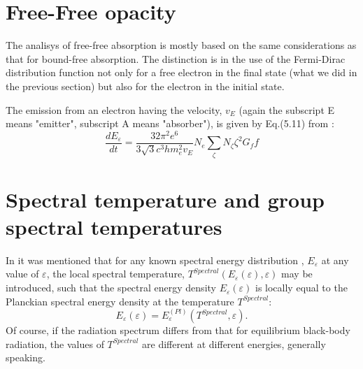 \section{Free-Free opacity}
The analisys of free-free absorption is mostly based on the same considerations as that for bound-free absorption. The distinction is in the use of the Fermi-Dirac 
distribution function not only for a free electron in the final state (what we did in the previous section) but also for the electron in the initial state.

The emission from an electron having the velocity, $v_E$ (again the subscript E means "emitter", subscript A means "absorber"), is given by Eq.(5.11) from \cite{RL}:
\begin{equation}
\frac{dE_\varepsilon}{dt}=\frac{32\pi^2e^6}{3\sqrt{3}c^3hm_e^2v_E}N_e\sum_\zeta{N_\zeta\zeta^2G_ff}
\end{equation}  

\section{Spectral temperature and group spectral temperatures}
In \cite{ll} it was mentioned that for any known spectral energy distribution , $E_\varepsilon$ at any value of $\varepsilon$, the local 
spectral temperature, $T^{Spectral}(E_\varepsilon(\varepsilon),\varepsilon)$ may be introduced, such that the spectral energy density 
$E_\varepsilon(\varepsilon)$ is locally equal to the Planckian spectral energy density at the temperature $T^{Spectral}$:
\begin{equation}
E_\varepsilon(\varepsilon)=E_\varepsilon^{(Pl)}(T^{Spectral},\varepsilon).
\end{equation}
Of course, if the radiation spectrum differs from that for equilibrium black-body radiation, the values of $T^{Spectral}$ are different at 
different energies, generally speaking.

